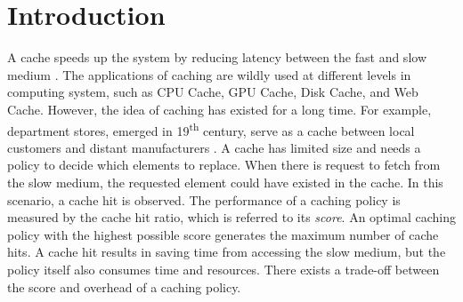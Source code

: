 \section{Introduction}
A cache speeds up the system by reducing latency between the fast and slow medium \cite{cache}.
The applications of caching are wildly used at different levels in computing system, such as
  CPU Cache, GPU Cache, Disk Cache, and Web Cache.
However, the idea of caching has existed for a long time.
For example, department stores, emerged in 19\textsuperscript{th} century,  
  serve as a cache between local customers and distant manufacturers \cite{departmentstores}.
A cache has limited size and needs a policy to decide which elements to replace.
When there is request to fetch from the slow medium, 
  the requested element could have existed in the cache.
In this scenario, a cache hit is observed.
The performance of a caching policy is measured by the cache hit ratio, 
  which is referred to its \textit{score}.
An optimal caching policy with the highest possible score generates the maximum number of cache hits.
A cache hit results in saving time from accessing the slow medium, 
  but the policy itself also consumes time and resources. 
There exists a trade-off between the score and overhead of a caching policy.\\


